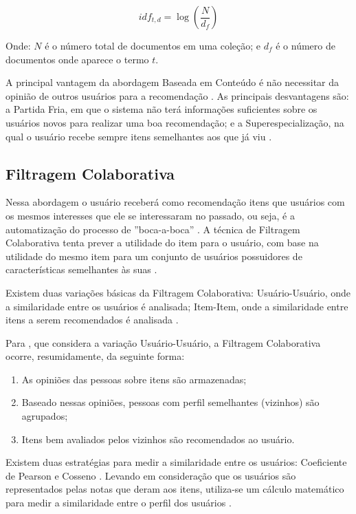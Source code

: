 \begin{equation}
  idf_{t,d} = \log(\frac{N}{d_f})
  \label{eq:idf}
\end{equation}

Onde: $N$ é o número total de documentos em uma coleção; e $d_f$ é o número de documentos onde aparece o termo $t$.

A principal vantagem da abordagem Baseada em Conteúdo é não necessitar da opinião de outros usuários para a recomendação
\cite{ricci2011introduction}. As principais desvantagens são: a Partida Fria, em que o sistema não terá informações
suficientes sobre os usuários novos para realizar uma boa recomendação; e a Superespecialização, na qual o
usuário recebe sempre itens semelhantes aos que já viu \cite{lops2011content}.

\subsection{Filtragem Colaborativa}

Nessa abordagem o usuário receberá como recomendação itens que usuários com os mesmos interesses que ele se
interessaram no passado, ou seja, é a automatização do processo de ''boca-a-boca'' \cite{jannach2010recommender}. A
técnica de Filtragem Colaborativa tenta prever a utilidade  do item para o usuário, com base na utilidade do mesmo
item para um conjunto de usuários  possuidores de características semelhantes às suas \cite{jannach2010recommender}.

Existem duas variações básicas da Filtragem Colaborativa: Usuário-Usuário, onde a similaridade entre os usuários é analisada;
Item-Item, onde a similaridade entre itens a serem recomendados é analisada \cite{jannach2010recommender}.

Para , que considera a variação Usuário-Usuário, a Filtragem Colaborativa ocorre,
resumidamente, da seguinte forma:

\begin{enumerate}
\item As opiniões das pessoas sobre itens são armazenadas;
\item Baseado nessas opiniões, pessoas com perfil semelhantes (vizinhos) são agrupados;
\item Itens bem avaliados pelos vizinhos são recomendados ao usuário.
\end{enumerate}

Existem duas estratégias para medir a similaridade entre os usuários: Coeficiente de Pearson e Cosseno
\cite{torres2004personalizaccao}. Levando em consideração que os usuários são representados pelas notas que deram aos
itens, utiliza-se um cálculo matemático para medir a similaridade entre o perfil dos usuários
\cite{torres2004personalizaccao}.

